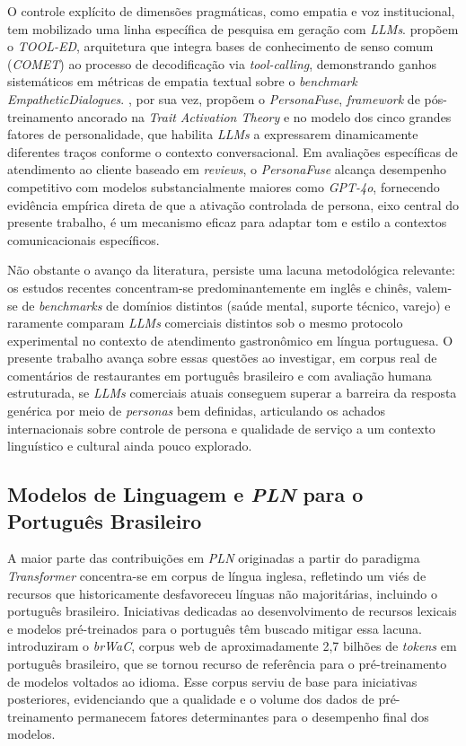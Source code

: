 \documentclass[12pt, a4paper]{article}
\numberwithin{equation}{section}
\begin{document}
O controle explícito de dimensões pragmáticas, como empatia e voz institucional, tem mobilizado uma linha específica de pesquisa em geração com \textit{LLMs}.  propõem o \textit{TOOL-ED}, arquitetura que integra bases de conhecimento de senso comum (\textit{COMET}) ao processo de decodificação via \textit{tool-calling}, demonstrando ganhos sistemáticos em métricas de empatia textual sobre o \textit{benchmark EmpatheticDialogues}. , por sua vez, propõem o \textit{PersonaFuse}, \textit{framework} de pós-treinamento ancorado na \textit{Trait Activation Theory} e no modelo dos cinco grandes fatores de personalidade, que habilita \textit{LLMs} a expressarem dinamicamente diferentes traços conforme o contexto conversacional. Em avaliações específicas de atendimento ao cliente baseado em \textit{reviews}, o \textit{PersonaFuse} alcança desempenho competitivo com modelos substancialmente maiores como \textit{GPT-4o}, fornecendo evidência empírica direta de que a ativação controlada de persona, eixo central do presente trabalho, é um mecanismo eficaz para adaptar tom e estilo a contextos comunicacionais específicos.

Não obstante o avanço da literatura, persiste uma lacuna metodológica relevante: os estudos recentes concentram-se predominantemente em inglês e chinês, valem-se de \textit{benchmarks} de domínios distintos (saúde mental, suporte técnico, varejo) e raramente comparam \textit{LLMs} comerciais distintos sob o mesmo protocolo experimental no contexto de atendimento gastronômico em língua portuguesa. O presente trabalho avança sobre essas questões ao investigar, em corpus real de comentários de restaurantes em português brasileiro e com avaliação humana estruturada, se \textit{LLMs} comerciais atuais conseguem superar a barreira da resposta genérica por meio de \textit{personas} bem definidas, articulando os achados internacionais sobre controle de persona e qualidade de serviço a um contexto linguístico e cultural ainda pouco explorado.


\subsection{Modelos de Linguagem e \textit{PLN} para o Português Brasileiro}

A maior parte das contribuições em \textit{PLN} originadas a partir do paradigma \textit{Transformer} concentra-se em corpus de língua inglesa, refletindo um viés de recursos que historicamente desfavoreceu línguas não majoritárias, incluindo o português brasileiro. Iniciativas dedicadas ao desenvolvimento de recursos lexicais e modelos pré-treinados para o português têm buscado mitigar essa lacuna.  introduziram o \textit{brWaC}, corpus web de aproximadamente 2,7 bilhões de \textit{tokens} em português brasileiro, que se tornou recurso de referência para o pré-treinamento de modelos voltados ao idioma. Esse corpus serviu de base para iniciativas posteriores, evidenciando que a qualidade e o volume dos dados de pré-treinamento permanecem fatores determinantes para o desempenho final dos modelos.
\end{document}
